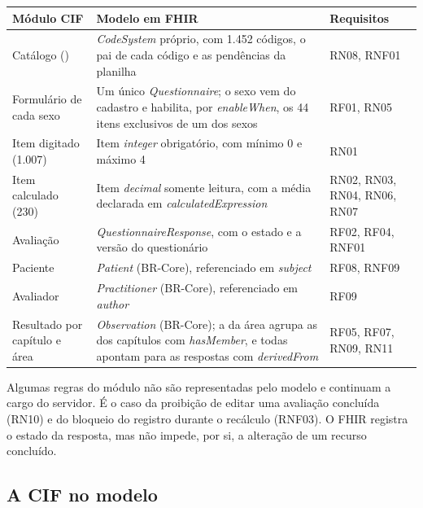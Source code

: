 \begin{quadro}[H]
	\centering
	\caption{Elementos do módulo CIF no modelo em HL7 FHIR}
	\label{qua:fhir-cif}
	\footnotesize
	\begin{tabularx}{\textwidth}{|>{\raggedright\arraybackslash}p{}|>{\raggedright\arraybackslash}X|>{\raggedright\arraybackslash}p{}|}
		\hline
		Módulo CIF & Modelo em FHIR & Requisitos \\ \hline
		Catálogo (\arq{catalogo.v0.1.json}) & \textit{CodeSystem} próprio, com 1.452 códigos, o pai de cada código e as
			pendências da planilha & RN08, RNF01 \\ \hline
		Formulário de cada sexo & Um único \textit{Questionnaire}; o sexo vem do cadastro e habilita, por
			\textit{enableWhen}, os 44 itens exclusivos de um dos sexos & RF01, RN05 \\ \hline
		Item digitado (1.007) & Item \textit{integer} obrigatório, com mínimo 0 e máximo 4 & RN01 \\ \hline
		Item calculado (230) & Item \textit{decimal} somente leitura, com a média declarada em
			\textit{calculatedExpression} & RN02, RN03, RN04, RN06, RN07 \\ \hline
		Avaliação & \textit{QuestionnaireResponse}, com o estado e a versão do questionário & RF02, RF04, RNF01 \\ \hline
		Paciente & \textit{Patient} (BR-Core), referenciado em \textit{subject} & RF08, RNF09 \\ \hline
		Avaliador & \textit{Practitioner} (BR-Core), referenciado em \textit{author} & RF09 \\ \hline
		Resultado por capítulo e área & \textit{Observation} (BR-Core); a da área agrupa as dos capítulos com
			\textit{hasMember}, e todas apontam para as respostas com \textit{derivedFrom} & RF05, RF07, RN09, RN11 \\ \hline
	\end{tabularx}
\end{quadro}

Algumas regras do módulo não são representadas pelo modelo e continuam a cargo do servidor. É o caso da proibição de
editar uma avaliação concluída (RN10) e do bloqueio do registro durante o recálculo (RNF03). O FHIR registra o estado
da resposta, mas não impede, por si, a alteração de um recurso concluído.

\subsection{A CIF no modelo}
\label{sec:fhir-cif}

